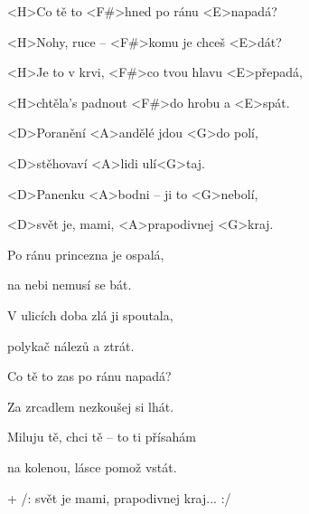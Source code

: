 

\zs
<H>Co tě to <F#>hned po ránu <E>napadá?

<H>Nohy, ruce -- <F#>komu je chceš <E>dát?

<H>Je to v krvi, <F#>co tvou hlavu <E>přepadá,

<H>chtěla's padnout <F#>do hrobu a <E>spát.
\ks

\zr
<D>Poranění <A>andělé jdou <G>do polí,

<D>stěhovaví <A>lidi ulí<G>taj.

<D>Panenku <A>bodni -- ji to <G>nebolí,

<D>svět je, mami, <A>prapodivnej <G>kraj.
\kr

\zs
Po ránu princezna je ospalá,

na nebi nemusí se bát.

V ulicích doba zlá ji spoutala,

polykač nálezů a ztrát.
\ks

\zr\kr

\zs
Co tě to zas po ránu napadá?

Za zrcadlem nezkoušej si lhát.

Miluju tě, chci tě -- to ti přísahám

na kolenou, lásce pomož vstát.
\ks

\zr\kr

+ /: svět je mami, prapodivnej kraj... :/

\kp
